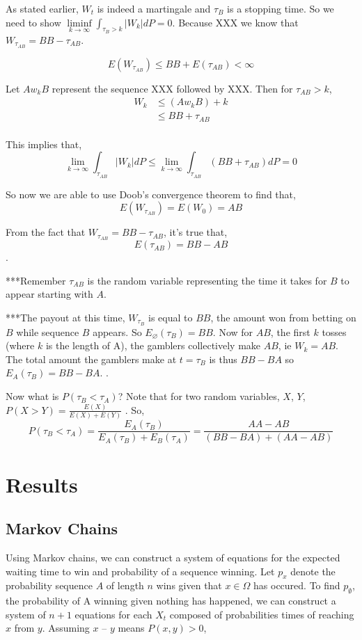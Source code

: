 \documentclass{article}
\numberwithin{mytheorem}{subsection} %
\begin{document}
			As stated earlier, $W_t$ is indeed a martingale and $\tau_B$ is a stopping time. So we need to show $\liminf\limits_{k\rightarrow \infty} \int_{\tau_B > k} |W_k|dP = 0$. Because XXX we know that $W_{\tau_{AB}} = BB - \tau_{AB}$.

			$$E(W_{\tau_{AB}}) \leq BB + E(\tau_{AB}) < \infty$$

			Let $Aw_k B$ represent the sequence XXX followed by XXX. Then for $\tau_{AB} > k$,
			\begin{equation}
			\begin{split}
			W_k & \leq (Aw_k B) + k \\
			    & \leq BB + \tau_{AB} \\
			\end{split}
			\end{equation}

			This implies that,
			$$\lim_{k\rightarrow \infty} \int_{\tau_{AB}} |W_k|dP \leq \lim_{k\rightarrow \infty} \int_{\tau_{AB}} (BB + \tau_{AB}) dP = 0$$

			So now we are able to use Doob's convergence theorem to find that,
			$$E(W_{\tau_{AB}}) = E(W_0) = AB$$

			From the fact that $W_{\tau_{AB}} = BB - \tau_{AB}$, it's true that,
			$$E(\tau_{AB}) = BB - AB$$.

			***Remember $\tau_{AB}$ is the random variable representing the time it takes for $B$ to appear starting with $A$.

			***The payout at this time, $W_{\tau_{B}}$ is equal to $BB$, the amount won from betting on $B$ while sequence $B$ appears. So $E_{\varnothing}(\tau_{B}) = BB$. Now for $AB$, the first $k$ tosses (where $k$ is the length of A), the gamblers collectively make $AB$, ie $W_k = AB$. The total amount the gamblers make at $t = \tau_{B}$ is thus $BB - BA$ so $E_A(\tau_{B}) = BB - BA$. \cite{grinstead}.

			Now what is $P(\tau_{B} < \tau_{A})$? Note that for two random variables, $X$, $Y$, $P(X > Y) = \frac{E(X)}{E(X) + E(Y)}$ \cite{grinstead}. So, $$P(\tau_{B} < \tau_{A}) = \frac{E_A(\tau_{B})}{E_A(\tau_{B}) + E_B(\tau_{A})} = \frac{AA - AB}{(BB - BA) + (AA - AB)}$$


	\section{Results}
		\subsection{Markov Chains}
			Using Markov chains, we can construct a system of equations for the expected waiting time to win and probability of a sequence winning. Let $p_{x}$ denote the probability sequence $A$ of length $n$ wins given that $x\in\Omega$ has occured. To find $p_\emptyset$, the probability of A winning given nothing has happened, we can construct a system of $n+1$ equations for each $X_t$ composed of probabilities times of reaching $x$ from $y$. Assuming $x$ -- $y$ means $P(x,y) > 0$,
\end{document}
